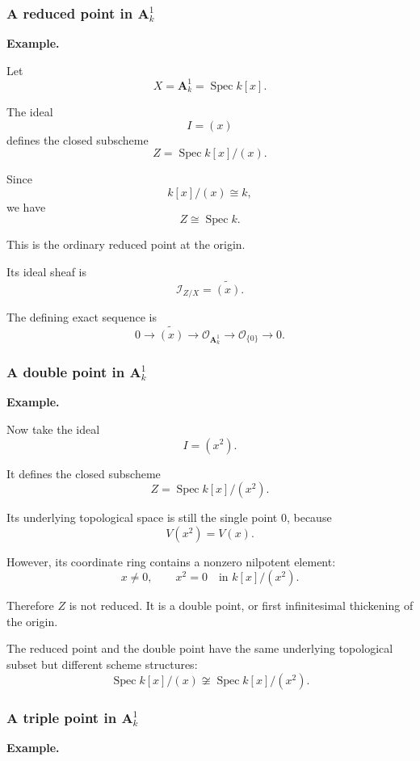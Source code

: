 \documentclass[12pt,a4paper]{article}
\theoremstyle{notespace}
\begin{document}
\subsubsection{A reduced point in \(\mathbf A^1_k\)}

\textbf{Example.}

Let
\[
X=\mathbf A^1_k=\operatorname{Spec}k[x].
\]

The ideal
\[
I=(x)
\]
defines the closed subscheme
\[
Z=\operatorname{Spec}k[x]/(x).
\]

Since
\[
k[x]/(x)\cong k,
\]
we have
\[
Z\cong\operatorname{Spec}k.
\]

This is the ordinary reduced point at the origin.

Its ideal sheaf is
\[
\mathcal I_{Z/X}=\widetilde{(x)}.
\]

The defining exact sequence is
\[
0
\longrightarrow
\widetilde{(x)}
\longrightarrow
\mathcal O_{\mathbf A^1_k}
\longrightarrow
\mathcal O_{\{0\}}
\longrightarrow
0.
\]

\subsubsection{A double point in \(\mathbf A^1_k\)}

\textbf{Example.}

Now take the ideal
\[
I=(x^2).
\]

It defines the closed subscheme
\[
Z=\operatorname{Spec}k[x]/(x^2).
\]

Its underlying topological space is still the single point \(0\), because
\[
V(x^2)=V(x).
\]

However, its coordinate ring contains a nonzero nilpotent element:
\[
x\neq0,
\qquad
x^2=0
\quad\text{in }k[x]/(x^2).
\]

Therefore \(Z\) is not reduced. It is a double point, or first infinitesimal thickening of the origin.

The reduced point and the double point have the same underlying topological subset but different scheme structures:
\[
\operatorname{Spec}k[x]/(x)
\not\cong
\operatorname{Spec}k[x]/(x^2).
\]

\subsubsection{A triple point in \(\mathbf A^1_k\)}

\textbf{Example.}
\end{document}
